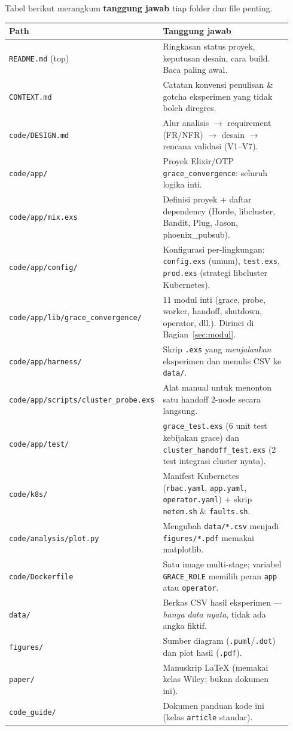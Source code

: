 \documentclass[11pt]{article}
\newcommand{\code}[1]{\texttt{\small #1}}
\begin{document}
Tabel berikut merangkum \textbf{tanggung jawab} tiap folder dan file penting.

\begin{longtable}{@{}p{0.34\linewidth} p{0.60\linewidth}@{}}
\toprule
\textbf{Path} & \textbf{Tanggung jawab} \\
\midrule
\endhead
\code{README.md} (top) & Ringkasan status proyek, keputusan desain, cara build. Baca paling awal. \\
\code{CONTEXT.md} & Catatan konvensi penulisan \& gotcha eksperimen yang tidak boleh diregres. \\
\code{code/DESIGN.md} & Alur analisis $\rightarrow$ requirement (FR/NFR) $\rightarrow$ desain $\rightarrow$ rencana validasi (V1--V7). \\
\code{code/app/} & Proyek Elixir/OTP \code{grace\_convergence}: seluruh logika inti. \\
\code{code/app/mix.exs} & Definisi proyek + daftar dependency (Horde, libcluster, Bandit, Plug, Jason, phoenix\_pubsub). \\
\code{code/app/config/} & Konfigurasi per-lingkungan: \code{config.exs} (umum), \code{test.exs}, \code{prod.exs} (strategi libcluster Kubernetes). \\
\code{code/app/lib/grace\_convergence/} & 11 modul inti (grace, probe, worker, handoff, shutdown, operator, dll.). Dirinci di Bagian~\ref{sec:modul}. \\
\code{code/app/harness/} & Skrip \code{.exs} yang \emph{menjalankan} eksperimen dan menulis CSV ke \code{data/}. \\
\code{code/app/scripts/cluster\_probe.exs} & Alat manual untuk menonton satu handoff 2-node secara langsung. \\
\code{code/app/test/} & \code{grace\_test.exs} (6 unit test kebijakan grace) dan \code{cluster\_handoff\_test.exs} (2 test integrasi cluster nyata). \\
\code{code/k8s/} & Manifest Kubernetes (\code{rbac.yaml}, \code{app.yaml}, \code{operator.yaml}) + skrip \code{netem.sh} \& \code{faults.sh}. \\
\code{code/analysis/plot.py} & Mengubah \code{data/*.csv} menjadi \code{figures/*.pdf} memakai matplotlib. \\
\code{code/Dockerfile} & Satu image multi-stage; variabel \code{GRACE\_ROLE} memilih peran \code{app} atau \code{operator}. \\
\code{data/} & Berkas CSV hasil eksperimen --- \emph{hanya data nyata}, tidak ada angka fiktif. \\
\code{figures/} & Sumber diagram (\code{.puml}/\code{.dot}) dan plot hasil (\code{.pdf}). \\
\code{paper/} & Manuskrip LaTeX (memakai kelas Wiley; bukan dokumen ini). \\
\code{code\_guide/} & Dokumen panduan kode ini (kelas \code{article} standar). \\
\bottomrule
\end{longtable}
\end{document}
